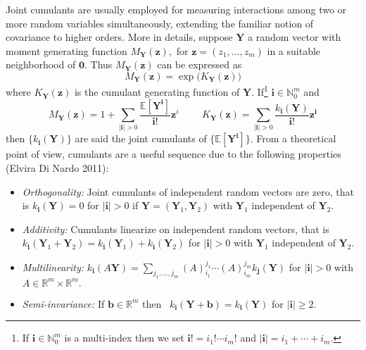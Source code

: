Joint cumulants are usually employed for measuring interactions among two or more random variables simultaneously, extending the familiar notion of covariance to higher orders. More in details, suppose \(\boldsymbol{Y}\) a random vector with moment generating function \(M_{\boldsymbol{Y}}(\boldsymbol{z}),\) for \(\boldsymbol{z}=(z_1, \ldots, z_m)\)
in a suitable neighborhood of \(\boldsymbol{0}.\) Thus \(M_{\boldsymbol{Y}}(\boldsymbol{z})\) can be expressed as
\begin{equation}
M_{\boldsymbol{Y}}(\boldsymbol{z}) = \exp\big(K_{\boldsymbol{Y}}(\boldsymbol{z}) \big) 
\label{(1bis)}
\end{equation}
where \(K_{\boldsymbol{Y}}(\boldsymbol{z})\) is the cumulant generating function of \(\boldsymbol{Y}.\) If\footnote{If \(\boldsymbol{i}\in {\mathbb N}_0^m\) is a multi-index then we set \(\boldsymbol{i}! = i_1! \cdots i_m!\) and \(|\boldsymbol{i}|=i_1 + \cdots + i_m.\)} \(\boldsymbol{i}\in {\mathbb N}_0^m\) and
\begin{equation}
M_{\boldsymbol{Y}}(\boldsymbol{z})=1 + \sum_{|\boldsymbol{i}| > 0} \frac{{\mathbb E}[\boldsymbol{Y}^{\boldsymbol{i}}]}{\boldsymbol{i}!} \boldsymbol{z}^i \, \qquad \, K_{\boldsymbol{Y}}(\boldsymbol{z}) = \sum_{|\boldsymbol{i}| > 0} \frac{k_{\boldsymbol{i}}(\boldsymbol{Y})}{\boldsymbol{i}!} \boldsymbol{z}^{\boldsymbol{i}}
\label{(2)}
\end{equation}
then \(\{k_{\boldsymbol{i}}(\boldsymbol{Y})\}\) are said the joint cumulants of \(\{{\mathbb E}[\boldsymbol{Y}^{\boldsymbol{i}}]\}.\) From a theoretical point of view, cumulants are a useful sequence due to the following properties (Elvira Di Nardo 2011):

\begin{itemize}
\item
  \emph{Orthogonality:} Joint cumulants of independent random vectors are zero, that is \(k_{\boldsymbol{i}}(\boldsymbol{Y}) = 0\) for \(|\boldsymbol{i}| > 0\) if \(\boldsymbol{Y} = (\boldsymbol{Y}_1, \boldsymbol{Y}_2)\) with \(\boldsymbol{Y}_1\) independent of \(\boldsymbol{Y}_2.\)
\item
  \emph{Additivity:} Cumulants linearize on independent random vectors, that is\\
  \(k_{\boldsymbol{i}}(\boldsymbol{Y}_1 + \boldsymbol{Y}_2) =k_{\boldsymbol{i}}(\boldsymbol{Y}_1) + k_{\boldsymbol{i}}(\boldsymbol{Y}_2)\)
  for \(|\boldsymbol{i}|> 0\) with \(\boldsymbol{Y}_1\) independent of \(\boldsymbol{Y}_2.\)
\item
  \emph{Multilinearity:} \(k_{\boldsymbol{i}}(A \boldsymbol{Y}) = \sum_{j_1, \ldots, j_m} (A)_{\scriptscriptstyle{i_1}}^{\scriptscriptstyle{j_1}} \cdots (A)_{\scriptscriptstyle{i_m}}^{\scriptscriptstyle{j_m}} k_{\boldsymbol{j}}(\boldsymbol{Y})\) for \(|\boldsymbol{i}|>0\) with \(A \in {\mathbb R}^m \times {\mathbb R}^m.\)
\item
  \emph{Semi-invariance:} If \(\boldsymbol{b} \in {\mathbb R}^m\) then~ \(k_{\boldsymbol{i}}(\boldsymbol{Y} + \boldsymbol{b}) = k_{\boldsymbol{i}}(\boldsymbol{Y})\) for \(|\boldsymbol{i}| \geq 2\).
\end{itemize}

